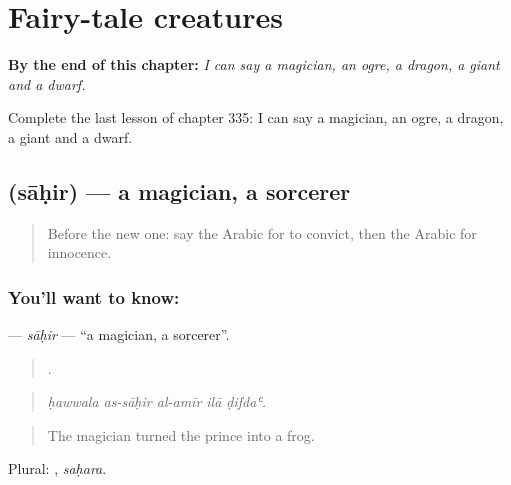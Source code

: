 
\chapter{Fairy-tale creatures}
\label{ch:ar-fairy-tale-creatures}

\begin{chapteropening}
\textbf{By the end of this chapter:} \emph{I can say a magician, an ogre, a dragon, a giant and a dwarf.}

Complete the last lesson of chapter 335: I can say a magician, an ogre, a dragon, a giant and a dwarf.
\end{chapteropening}

\section[\texorpdfstring{\ar{ساحر} (sāḥir)}{ساحر (sāḥir)}]{ (sāḥir) — a magician, a sorcerer}

\label{lesson:AR-C335-sahir}



\begin{quote}
Before the new one: say the Arabic for to convict, then the Arabic for innocence.
\end{quote}

\subsection*{You'll want to know: }
\textbf{} — \emph{sāḥir} — \textquotedblleft{}a magician, a sorcerer\textquotedblright{}.

\begin{quote}
    .
\end{quote}

\begin{quote}
\emph{ḥawwala as-sāḥir al-amīr ilā ḍifdaʿ.}
\end{quote}

\begin{quote}
The magician turned the prince into a frog.
\end{quote}

Plural: , \emph{saḥara}.

